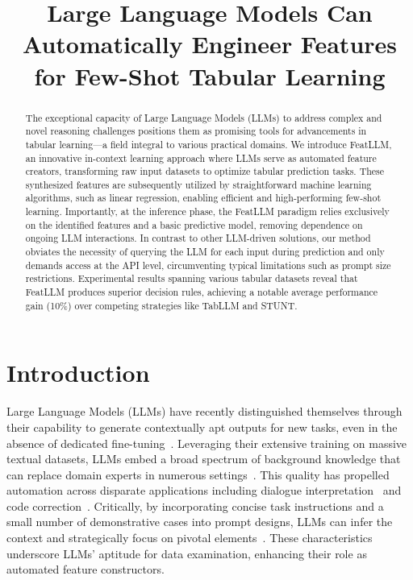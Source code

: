 \title{Large Language Models Can Automatically Engineer Features for Few-Shot Tabular Learning}

\begin{abstract}
The exceptional capacity of Large Language Models (LLMs) to address complex and novel reasoning challenges positions them as promising tools for advancements in tabular learning—a field integral to various practical domains. We introduce \textsf{FeatLLM}, an innovative in-context learning approach where LLMs serve as automated feature creators, transforming raw input datasets to optimize tabular prediction tasks. These synthesized features are subsequently utilized by straightforward machine learning algorithms, such as linear regression, enabling efficient and high-performing few-shot learning. Importantly, at the inference phase, the \textsf{FeatLLM} paradigm relies exclusively on the identified features and a basic predictive model, removing dependence on ongoing LLM interactions. In contrast to other LLM-driven solutions, our method obviates the necessity of querying the LLM for each input during prediction and only demands access at the API level, circumventing typical limitations such as prompt size restrictions. Experimental results spanning various tabular datasets reveal that \textsf{FeatLLM} produces superior decision rules, achieving a notable average performance gain (10\%) over competing strategies like TabLLM and STUNT.
\end{abstract}

\section{Introduction}
Large Language Models (LLMs) have recently distinguished themselves through their capability to generate contextually apt outputs for new tasks, even in the absence of dedicated fine-tuning~\cite{creswell2022selection,imani2023mathprompter,taylor2022galactica}. Leveraging their extensive training on massive textual datasets, LLMs embed a broad spectrum of background knowledge that can replace domain experts in numerous settings~\cite{Genomes2021,singhal2023large,wilcox2003role}. This quality has propelled automation across disparate applications including dialogue interpretation~\cite{finch2023leveraging} and code correction~\cite{fan2023automated}. Critically, by incorporating concise task instructions and a small number of demonstrative cases into prompt designs, LLMs can infer the context and strategically focus on pivotal elements~\cite{brown2020language,zhao2023survey}. These characteristics underscore LLMs’ aptitude for data examination, enhancing their role as automated feature constructors.

